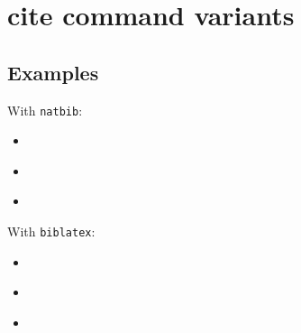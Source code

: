 \documentclass{article}
\begin{document}
\section*{cite command variants}


\cite{key}

\cite{key1,key2,key3}

\cite[see]{key}
\cite[see][p. 5]{key}


\citet{key}
\citet[see]{key}
\citet[see][p. 5]{key}

\citep{key}
\citep[see]{key}
\citep[see][p. 5]{key}

\citet*{key}
\citep*{key}

\citeauthor{key}
\citeauthor*{key}

\citeyear{key}
\citeyearpar{key}  %

\citep{key1,key2,key3}
\citet{key1,key2,key3}


\cite{key}
\cite[p. 5]{key}
\cite[see][p. 5]{key}

\textcite{key}
\textcite[p. 5]{key}

\parencite{key}
\parencite[p. 5]{key}

\citeauthor{key}
\citeauthor*{key}

\citeyear{key}
\citeyear[p. 5]{key}


\nocite{key}

\cite{key1,key2,key3}


\subsection*{Examples}

With \texttt{natbib}:
\begin{itemize}
  \item \citet{smith2020}
  \item \citep{smith2020}
  \item \citep[see][p. 5]{smith2020}
\end{itemize}

With \texttt{biblatex}:
\begin{itemize}
  \item \textcite{smith2020}
  \item \parencite{smith2020}
  \item \cite[see][p. 5]{smith2020}
\end{itemize}
\end{document}

